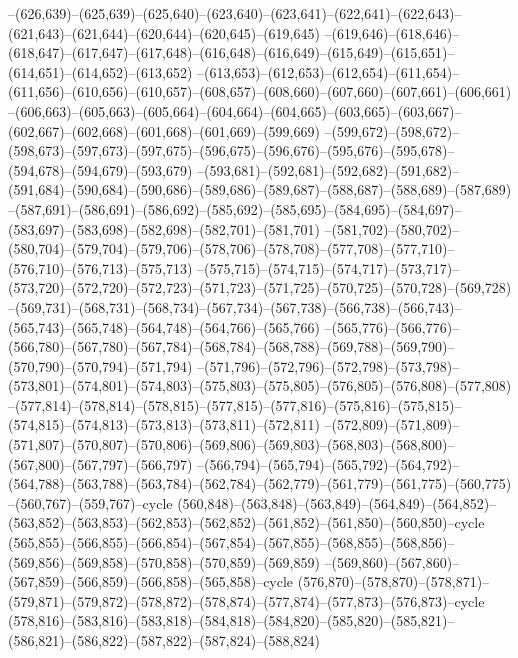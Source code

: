 --(626,639)--(625,639)--(625,640)--(623,640)--(623,641)--(622,641)--(622,643)--(621,643)--(621,644)--(620,644)--(620,645)--(619,645)
--(619,646)--(618,646)--(618,647)--(617,647)--(617,648)--(616,648)--(616,649)--(615,649)--(615,651)--(614,651)--(614,652)--(613,652)
--(613,653)--(612,653)--(612,654)--(611,654)--(611,656)--(610,656)--(610,657)--(608,657)--(608,660)--(607,660)--(607,661)--(606,661)
--(606,663)--(605,663)--(605,664)--(604,664)--(604,665)--(603,665)--(603,667)--(602,667)--(602,668)--(601,668)--(601,669)--(599,669)
--(599,672)--(598,672)--(598,673)--(597,673)--(597,675)--(596,675)--(596,676)--(595,676)--(595,678)--(594,678)--(594,679)--(593,679)
--(593,681)--(592,681)--(592,682)--(591,682)--(591,684)--(590,684)--(590,686)--(589,686)--(589,687)--(588,687)--(588,689)--(587,689)
--(587,691)--(586,691)--(586,692)--(585,692)--(585,695)--(584,695)--(584,697)--(583,697)--(583,698)--(582,698)--(582,701)--(581,701)
--(581,702)--(580,702)--(580,704)--(579,704)--(579,706)--(578,706)--(578,708)--(577,708)--(577,710)--(576,710)--(576,713)--(575,713)
--(575,715)--(574,715)--(574,717)--(573,717)--(573,720)--(572,720)--(572,723)--(571,723)--(571,725)--(570,725)--(570,728)--(569,728)
--(569,731)--(568,731)--(568,734)--(567,734)--(567,738)--(566,738)--(566,743)--(565,743)--(565,748)--(564,748)--(564,766)--(565,766)
--(565,776)--(566,776)--(566,780)--(567,780)--(567,784)--(568,784)--(568,788)--(569,788)--(569,790)--(570,790)--(570,794)--(571,794)
--(571,796)--(572,796)--(572,798)--(573,798)--(573,801)--(574,801)--(574,803)--(575,803)--(575,805)--(576,805)--(576,808)--(577,808)
--(577,814)--(578,814)--(578,815)--(577,815)--(577,816)--(575,816)--(575,815)--(574,815)--(574,813)--(573,813)--(573,811)--(572,811)
--(572,809)--(571,809)--(571,807)--(570,807)--(570,806)--(569,806)--(569,803)--(568,803)--(568,800)--(567,800)--(567,797)--(566,797)
--(566,794)--(565,794)--(565,792)--(564,792)--(564,788)--(563,788)--(563,784)--(562,784)--(562,779)--(561,779)--(561,775)--(560,775)
--(560,767)--(559,767)--cycle
(560,848)--(563,848)--(563,849)--(564,849)--(564,852)--(563,852)--(563,853)--(562,853)--(562,852)--(561,852)--(561,850)--(560,850)--cycle
(565,855)--(566,855)--(566,854)--(567,854)--(567,855)--(568,855)--(568,856)--(569,856)--(569,858)--(570,858)--(570,859)--(569,859)
--(569,860)--(567,860)--(567,859)--(566,859)--(566,858)--(565,858)--cycle
(576,870)--(578,870)--(578,871)--(579,871)--(579,872)--(578,872)--(578,874)--(577,874)--(577,873)--(576,873)--cycle
(578,816)--(583,816)--(583,818)--(584,818)--(584,820)--(585,820)--(585,821)--(586,821)--(586,822)--(587,822)--(587,824)--(588,824)
